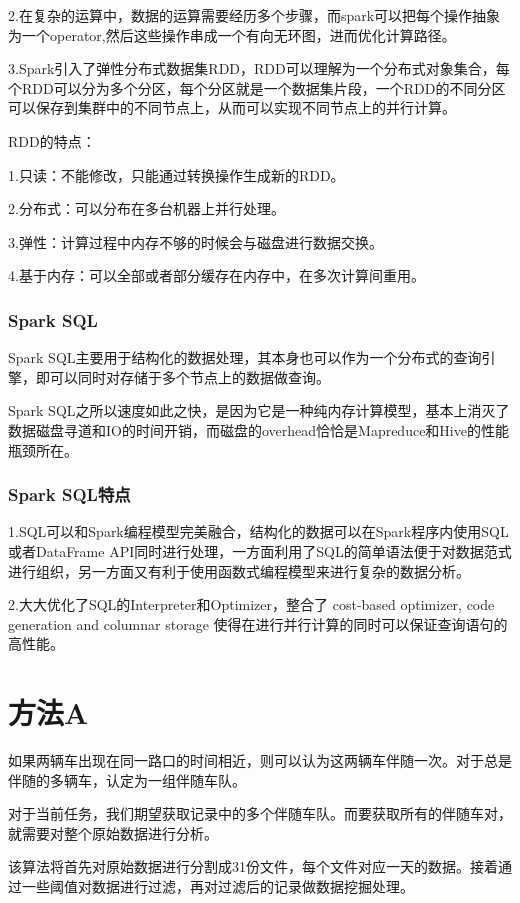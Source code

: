 \documentclass[CJK]{ctexart}
\begin{document}
\begin{multicols}{2}
2.在复杂的运算中，数据的运算需要经历多个步骤，而spark可以把每个操作抽象为一个operator,然后这些操作串成一个有向无环图，进而优化计算路径。

3.Spark引入了弹性分布式数据集RDD，RDD可以理解为一个分布式对象集合，每个RDD可以分为多个分区，每个分区就是一个数据集片段，一个RDD的不同分区可以保存到集群中的不同节点上，从而可以实现不同节点上的并行计算。

RDD的特点：

1.只读：不能修改，只能通过转换操作生成新的RDD。

2.分布式：可以分布在多台机器上并行处理。

3.弹性：计算过程中内存不够的时候会与磁盘进行数据交换。

4.基于内存：可以全部或者部分缓存在内存中，在多次计算间重用。
\subsubsection{Spark SQL}
Spark SQL主要用于结构化的数据处理，其本身也可以作为一个分布式的查询引擎，即可以同时对存储于多个节点上的数据做查询。

Spark SQL之所以速度如此之快，是因为它是一种纯内存计算模型，基本上消灭了数据磁盘寻道和IO的时间开销，而磁盘的overhead恰恰是Mapreduce和Hive的性能瓶颈所在。
\subsubsection{Spark SQL特点}

1.SQL可以和Spark编程模型完美融合，结构化的数据可以在Spark程序内使用SQL或者DataFrame API同时进行处理，一方面利用了SQL的简单语法便于对数据范式进行组织，另一方面又有利于使用函数式编程模型来进行复杂的数据分析。

2.大大优化了SQL的Interpreter和Optimizer，整合了 cost-based optimizer, code generation and columnar storage 使得在进行并行计算的同时可以保证查询语句的高性能。

\section{方法A}
如果两辆车出现在同一路口的时间相近，则可以认为这两辆车伴随一次。对于总是伴随的多辆车，认定为一组伴随车队。

对于当前任务，我们期望获取记录中的多个伴随车队。而要获取所有的伴随车对，就需要对整个原始数据进行分析。

该算法将首先对原始数据进行分割成31份文件，每个文件对应一天的数据。接着通过一些阈值对数据进行过滤，再对过滤后的记录做数据挖掘处理。


\end{multicols}
\end{document}
